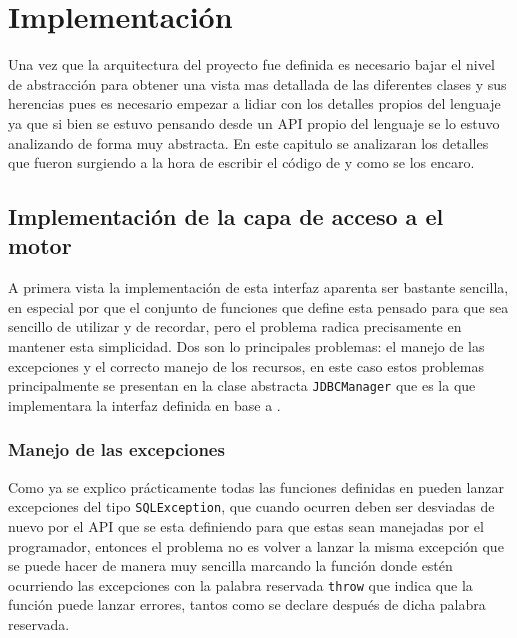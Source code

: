 \chapter{Implementación}
Una vez que la arquitectura del proyecto fue definida es necesario bajar el nivel de abstracción para obtener una vista mas detallada de las diferentes clases y sus herencias pues es necesario empezar a lidiar con los detalles propios del lenguaje ya que si bien se estuvo pensando desde un API propio del lenguaje se lo estuvo analizando de forma muy abstracta. En este capitulo se analizaran los detalles que fueron surgiendo a la hora de escribir el código de \jj y como se los encaro.
%
%
%
\section{Implementación de la capa de acceso a el motor}
A primera vista la implementación de esta interfaz aparenta ser bastante sencilla, en especial por que el conjunto de funciones que define esta pensado para que sea sencillo de utilizar y de recordar, pero el problema radica precisamente en mantener esta simplicidad. Dos son lo principales problemas: el manejo de las excepciones y el correcto manejo de los recursos, en este caso estos problemas principalmente se presentan en la clase abstracta \verb=JDBCManager= que es la que implementara la interfaz definida en base a \jd.
%
\subsection{Manejo de las excepciones}
Como ya se explico prácticamente todas las funciones definidas en \jd pueden lanzar excepciones del tipo \verb=SQLException=, que cuando ocurren deben ser desviadas de nuevo por el API que se esta definiendo para que estas sean manejadas por el programador, entonces el problema   no es volver a lanzar la misma excepción que se puede hacer de manera muy sencilla marcando la función donde estén ocurriendo las excepciones con la palabra reservada \verb=throw= que indica que la función puede lanzar errores, tantos como se declare después de dicha palabra reservada.

